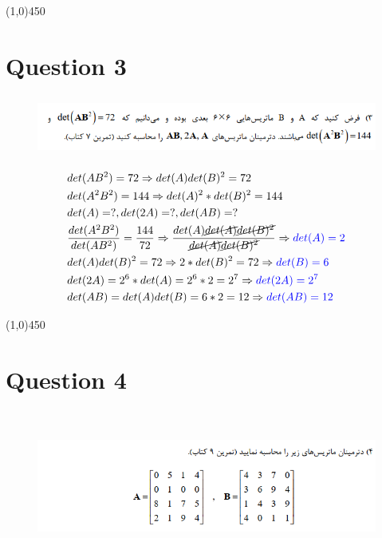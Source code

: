 \documentclass[a4paper,12pt]{article}
\begin{document}
\line(1,0){450}
\newpage

\section {Question 3 }

\begin{figure}[h!]
	\centering
	\includegraphics*[height=2cm]{Q3}
\end{figure}

\begin{doublespace}
	\begin{align*}
		&det(AB^2) = 72 \Rightarrow det(A)det(B)^2 = 72 \\
		&det(A^2B^2) = 144 \Rightarrow det(A)^2 * det(B)^2 = 144\\
		&det(A) = ? , det(2A) = ? , det(AB) = ? \\
		&\frac{det(A^2B^2)}{det(AB^2)} = \frac{144}{72} \Rightarrow  \frac{ det(A) \cancel{det(A)}  \cancel{ det(B)^2}}{\cancel{det(A)} \cancel{det(B)^2}} \Rightarrow \textcolor{blue}{ det(A) = 2}  \\
		& det(A)det(B)^2 = 72 \Rightarrow 2 * det(B)^2 = 72 \Rightarrow \textcolor{blue}{ det(B) = 6} \\
		&det(2A) = 2^6 * det(A) = 2^6 * 2 = 2^7   \Rightarrow \textcolor{blue}{ det(2A) = 2^7 }\\
		&det(AB) = det(A) det(B) = 6 * 2 = 12 \Rightarrow \textcolor{blue}{det(AB) = 12 }
	\end{align*}
\end{doublespace}
\line(1,0){450}
\newpage
\section {Question 4 }

\begin{figure}[h!]
	\centering
	\includegraphics*[height=5cm]{Q4}
\end{figure}
\end{document}
